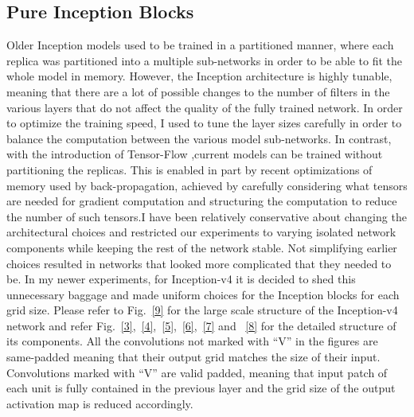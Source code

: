 \documentclass[a4paper,12pt, twoside]{NITKReport}
\begin{document}
\subsection{Pure Inception Blocks}
Older Inception models used to be trained in a partitioned manner, where each replica was partitioned into a multiple sub-networks in order to be able to fit the whole model in memory.  However, the Inception architecture is highly  tunable,  meaning  that  there  are  a  lot  of  possible changes to the number of filters in the various layers that do  not  affect  the  quality  of  the  fully  trained  network. In order to optimize the training speed,  I used to tune the layer sizes carefully in order to balance the computation between the various model sub-networks. In contrast, with the introduction of Tensor-Flow ,current models can be trained without partitioning the replicas. This is enabled in part by recent optimizations of memory used by back-propagation, achieved by carefully considering what tensors are needed for gradient computation and structuring the computation to reduce the number of such tensors.I have been relatively conservative about changing the architectural choices and restricted our experiments to varying isolated network components while keeping the rest of the network stable.  Not simplifying earlier choices resulted in networks that looked more complicated that they needed to be. In my newer experiments, for Inception-v4 it is decided to shed this unnecessary baggage and made uniform choices for the Inception blocks for each grid size.  Please refer to Fig.~\ref{9} for the large scale structure of the Inception-v4 network and refer Fig.~\ref{3},~\ref{4},~\ref{5},~\ref{6},~\ref{7} and ~\ref{8} for the detailed structure  of  its  components.   All  the  convolutions  not  marked with “V” in the figures are same-padded meaning that their output grid matches the size of their input. Convolutions marked with “V” are valid padded, meaning that input patch of each unit is fully contained in the previous layer and the grid  size  of  the  output  activation  map  is  reduced  accordingly.\cite{DBLP:journals/corr/SzegedyIV16}
\end{document}
